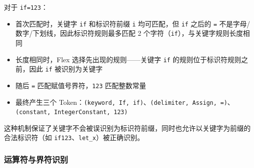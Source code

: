 \documentclass[12pt,a4paper]{ctexart}
\begin{document}
对于 \texttt{if=123}：
\begin{itemize}
    \item 首次匹配时，关键字 \texttt{if} 和标识符前缀 \texttt{i} 均可匹配，但 \texttt{if} 之后的 \texttt{=} 不是字母/数字/下划线，因此标识符规则最多匹配 2 个字符（\texttt{if}），与关键字规则长度相同
    \item 长度相同时，Flex 选择先出现的规则——关键字 \texttt{if} 的规则位于标识符规则之前，因此 \texttt{if} 被识别为关键字
    \item 随后 \texttt{=} 匹配赋值号界符，\texttt{123} 匹配整数常量
    \item 最终产生三个 Token：\texttt{(keyword, If, if)}、\texttt{(delimiter, Assign, =)}、\texttt{(constant, IntegerConstant, 123)}
\end{itemize}

这种机制保证了关键字不会被误识别为标识符前缀，同时也允许以关键字为前缀的合法标识符（如 \texttt{if123}、\texttt{let\_x}）被正确识别。

\subsubsection{运算符与界符识别}
\end{document}
